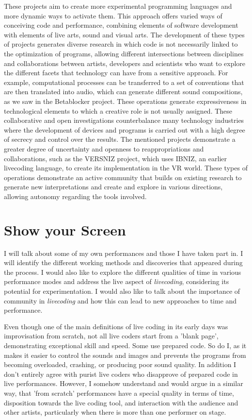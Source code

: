 \documentclass[12pt, twoside, a4paper]{report}
\begin{document}
These projects aim to create more experimental programming languages and more dynamic ways to activate them. This approach offers varied ways of conceiving code and performance, combining elements of software development with elements of live arts, sound and visual arts. The development of these types of projects generates diverse research in which code is not necessarily linked to the optimization of programs, allowing different intersections between disciplines and collaborations between artists, developers and scientists who want to explore the different facets that technology can have from a sensitive approach. For example, computational processes can be transferred to a set of conventions that are then translated into audio, which can generate different sound compositions, as we saw in the Betablocker project. These operations generate expressiveness in technological elements to which a creative role is not usually assigned.  These collaborative and open investigations counterbalance many technology industries where the development of devices and programs is carried out with a high degree of secrecy and control over the results. The mentioned projects demonstrate a greater degree of uncertainty and openness to reappropriations and collaborations, such as the VERSNIZ project, which uses IBNIZ, an earlier livecoding language, to create its implementation in the VR world. These types of operations demonstrate an active community that builds on existing research to generate new interpretations and create and explore in various directions, allowing autonomy regarding the tools involved.


\newpage

\chapter{Show your Screen}

I will talk about some of my own performances and those I have taken part in. I will identify the different working methods and discoveries that appeared during the process. I would also like to explore the different qualities of time in various performance modes and address the live aspect of \textit{livecoding}, considering its potential for experimentation. I would also like to talk about the importance of community in \textit{livecoding} and how this can lead to new approaches to time and performance.

Even though one of the main definitions of live coding in its early days was improvisation from scratch, not all live coders start from a 'blank page', demonstrating exceptional skill and speed. Some use prepared code. 
So do I, as it makes it easier to control the sounds and images and prevents the programs from becoming overloaded, crashing, or producing poor sound quality. In addition I don't entirely agree with purist live coders who disapprove of prepared code in live performances. However, I somehow understand and would argue in a similar way, that 'from scratch' performances have a special quality in terms of time, disposition towards the live
coding tool, and interaction with the audience and other artists, particularly
when there is more than one performer on stage.
\end{document}
